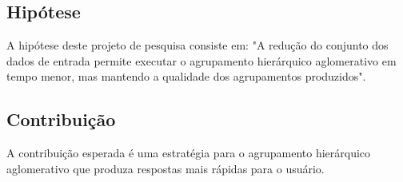 \subsection{Hipótese}

A hipótese deste projeto de pesquisa consiste em: "A redução do conjunto dos
dados de entrada permite executar o agrupamento hierárquico aglomerativo em
tempo menor, mas mantendo a qualidade dos agrupamentos produzidos".

\subsection{Contribuição}

A contribuição esperada é uma estratégia para o agrupamento hierárquico
aglomerativo que produza respostas mais rápidas para o usuário.